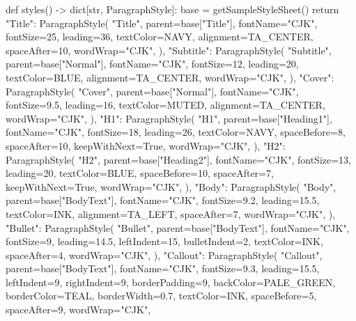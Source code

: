 \documentclass[UTF8,a4paper,fontset=fandol]{ctexart}
\begin{document}
\begin{ProjectCode}
{def styles() -> dict[str, ParagraphStyle]:
    base = getSampleStyleSheet()
    return {
        "Title": ParagraphStyle(
            "Title",
            parent=base["Title"],
            fontName="CJK",
            fontSize=25,
            leading=36,
            textColor=NAVY,
            alignment=TA_CENTER,
            spaceAfter=10,
            wordWrap="CJK",
        ),
        "Subtitle": ParagraphStyle(
            "Subtitle",
            parent=base["Normal"],
            fontName="CJK",
            fontSize=12,
            leading=20,
            textColor=BLUE,
            alignment=TA_CENTER,
            wordWrap="CJK",
        ),
        "Cover": ParagraphStyle(
            "Cover",
            parent=base["Normal"],
            fontName="CJK",
            fontSize=9.5,
            leading=16,
            textColor=MUTED,
            alignment=TA_CENTER,
            wordWrap="CJK",
        ),
        "H1": ParagraphStyle(
            "H1",
            parent=base["Heading1"],
            fontName="CJK",
            fontSize=18,
            leading=26,
            textColor=NAVY,
            spaceBefore=8,
            spaceAfter=10,
            keepWithNext=True,
            wordWrap="CJK",
        ),
        "H2": ParagraphStyle(
            "H2",
            parent=base["Heading2"],
            fontName="CJK",
            fontSize=13,
            leading=20,
            textColor=BLUE,
            spaceBefore=10,
            spaceAfter=7,
            keepWithNext=True,
            wordWrap="CJK",
        ),
        "Body": ParagraphStyle(
            "Body",
            parent=base["BodyText"],
            fontName="CJK",
            fontSize=9.2,
            leading=15.5,
            textColor=INK,
            alignment=TA_LEFT,
            spaceAfter=7,
            wordWrap="CJK",
        ),
        "Bullet": ParagraphStyle(
            "Bullet",
            parent=base["BodyText"],
            fontName="CJK",
            fontSize=9,
            leading=14.5,
            leftIndent=15,
            bulletIndent=2,
            textColor=INK,
            spaceAfter=4,
            wordWrap="CJK",
        ),
        "Callout": ParagraphStyle(
            "Callout",
            parent=base["BodyText"],
            fontName="CJK",
            fontSize=9.3,
            leading=15.5,
            leftIndent=9,
            rightIndent=9,
            borderPadding=9,
            backColor=PALE_GREEN,
            borderColor=TEAL,
            borderWidth=0.7,
            textColor=INK,
            spaceBefore=5,
            spaceAfter=9,
            wordWrap="CJK",
}}
\end{ProjectCode}
\end{document}
